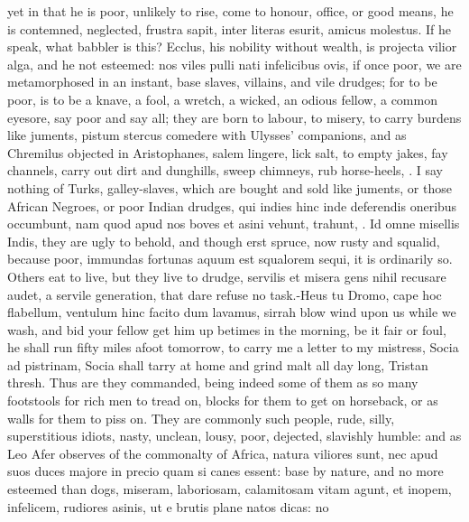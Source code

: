 {yet in that he is poor, unlikely to rise, come to honour, office, or
good means, he is contemned, neglected, frustra sapit, inter literas
esurit, amicus molestus. If he speak, what babbler is this?
Ecclus, his nobility without wealth, is projecta vilior alga, and
he not esteemed: nos viles pulli nati infelicibus ovis, if once poor,
we are metamorphosed in an instant, base slaves, villains, and vile
drudges; for to be poor, is to be a knave, a fool, a wretch, a
wicked, an odious fellow, a common eyesore, say poor and say all; they
are born to labour, to misery, to carry burdens like juments, pistum
stercus comedere with Ulysses' companions, and as Chremilus objected in
Aristophanes,  salem lingere, lick salt, to empty jakes, fay
channels, carry out dirt and dunghills, sweep chimneys, rub
horse-heels, \etc{}. I say nothing of Turks, galley-slaves, which are
bought and sold like juments, or those African Negroes, or poor
Indian drudges, qui indies hinc inde deferendis oneribus
occumbunt, nam quod apud nos boves et asini vehunt, trahunt, \etc{}.
Id omne misellis Indis, they are ugly to behold, and though erst
spruce, now rusty and squalid, because poor, immundas fortunas
aquum est squalorem sequi, it is ordinarily so. Others eat to
live, but they live to drudge, servilis et misera gens nihil
recusare audet, a servile generation, that dare refuse no
task.-Heus tu Dromo, cape hoc flabellum, ventulum hinc facito dum
lavamus, sirrah blow wind upon us while we wash, and bid your fellow
get him up betimes in the morning, be it fair or foul, he shall run
fifty miles afoot tomorrow, to carry me a letter to my mistress, Socia
ad pistrinam, Socia shall tarry at home and grind malt all day long,
Tristan thresh. Thus are they commanded, being indeed some of them as
so many footstools for rich men to tread on, blocks for them to get on
horseback, or as walls for them to piss on. They are commonly
such people, rude, silly, superstitious idiots, nasty, unclean, lousy,
poor, dejected, slavishly humble: and as Leo Afer observes of the
commonalty of Africa, natura viliores sunt, nec apud suos duces majore
in precio quam si canes essent: base by nature, and no more
esteemed than dogs, miseram, laboriosam, calamitosam vitam agunt, et
inopem, infelicem, rudiores asinis, ut e brutis plane natos dicas: no
}

